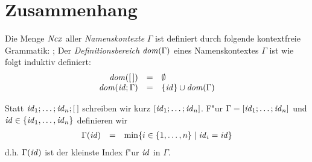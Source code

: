 \documentclass[12pt,fleqn,a4paper]{article}
\begin{document}
\section{Zusammenhang}

\begin{definition}[Namenskontext]
  Die Menge ${\text{\it Ncx\/}}$ aller \emph{Namenskontexte} $\Gamma$ ist definiert durch folgende kontextfreie Grammatik:
  \bgram
  \Gamma \is [\,]
  \al \id;\Gamma
  \egram
  Der \emph{Definitionsbereich} ${\text{\it dom\/}}(\Gamma)$ eines Namenskontextes $\Gamma$ ist wie folgt induktiv definiert:
  \[\begin{array}{rcl}
    {\text{\it dom\/}}([\,]) &=& \emptyset \\
    {\text{\it dom\/}}({\text{\it id\/}};\Gamma) &=& \{{\text{\it id\/}}\} \cup {\text{\it dom\/}}(\Gamma) \\
  \end{array}\]
\end{definition}

\noindent
Statt ${\text{\it id\/}}_1;\ldots;{\text{\it id\/}}_n;[\,]$ schreiben wir kurz $[{\text{\it id\/}}_1;\ldots;{\text{\it id\/}}_n]$. F"ur $\Gamma = [{\text{\it id\/}}_1;\ldots;{\text{\it id\/}}_n]$
und ${\text{\it id\/}} \in\{{\text{\it id\/}}_1,\ldots,{\text{\it id\/}}_n\}$ definieren wir
\[\begin{array}{rcl}
  \Gamma({\text{\it id\/}}) &=& \min \{i \in \{1,\ldots,n\} \mid {\text{\it id\/}}_i = {\text{\it id\/}}\}
\end{array}\]
d.h. $\Gamma({\text{\it id\/}})$ ist der kleinste Index f"ur ${\text{\it id\/}}$ in $\Gamma$.
\end{document}
